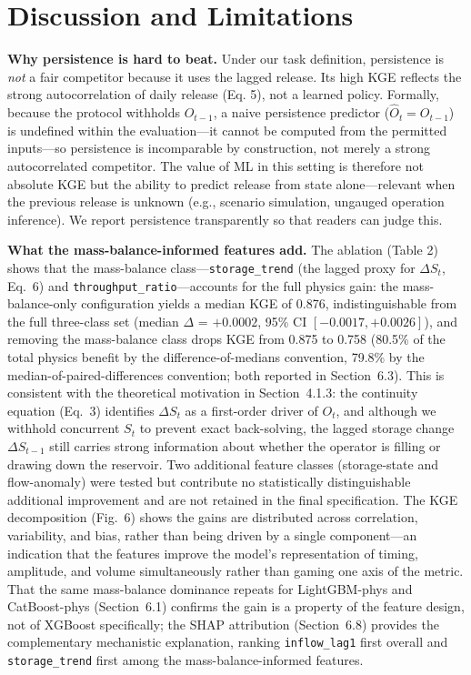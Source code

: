 \documentclass[journal]{ascelike-new}
\begin{document}
\section{Discussion and Limitations}


\textbf{Why persistence is hard to beat.} Under our task definition, persistence is \emph{not} a fair competitor because it uses the lagged release. Its high KGE reflects the strong autocorrelation of daily release (Eq. 5), not a learned policy. Formally, because the protocol withholds $O_{t-1}$, a naive persistence predictor ($\hat O_t = O_{t-1}$) is undefined within the evaluation---it cannot be computed from the permitted inputs---so persistence is incomparable by construction, not merely a strong autocorrelated competitor. The value of ML in this setting is therefore not absolute KGE but the ability to predict release from state alone---relevant when the previous release is unknown (e.g., scenario simulation, ungauged operation inference). We report persistence transparently so that readers can judge this.


\textbf{What the mass-balance-informed features add.} The ablation (Table 2) shows that the mass-balance class---\texttt{storage\_trend} (the lagged proxy for $\Delta S_t$, Eq.~6) and \texttt{throughput\_ratio}---accounts for the full physics gain: the mass-balance-only configuration yields a median KGE of 0.876, indistinguishable from the full three-class set (median $\Delta$ = $+0.0002$, 95\% CI $[-0.0017, +0.0026]$), and removing the mass-balance class drops KGE from 0.875 to 0.758 (80.5\% of the total physics benefit by the difference-of-medians convention, 79.8\% by the median-of-paired-differences convention; both reported in Section~6.3). This is consistent with the theoretical motivation in Section~4.1.3: the continuity equation (Eq.~3) identifies $\Delta S_t$ as a first-order driver of $O_t$, and although we withhold concurrent $S_t$ to prevent exact back-solving, the lagged storage change $\Delta S_{t-1}$ still carries strong information about whether the operator is filling or drawing down the reservoir. Two additional feature classes (storage-state and flow-anomaly) were tested but contribute no statistically distinguishable additional improvement and are not retained in the final specification. The KGE decomposition (Fig.~6) shows the gains are distributed across correlation, variability, and bias, rather than being driven by a single component---an indication that the features improve the model's representation of timing, amplitude, and volume simultaneously rather than gaming one axis of the metric. That the same mass-balance dominance repeats for LightGBM-phys and CatBoost-phys (Section~6.1) confirms the gain is a property of the feature design, not of XGBoost specifically; the SHAP attribution (Section~6.8) provides the complementary mechanistic explanation, ranking \texttt{inflow\_lag1} first overall and \texttt{storage\_trend} first among the mass-balance-informed features.
\end{document}
